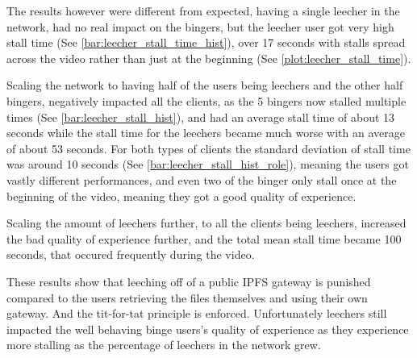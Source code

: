 The results however were different from expected, having a single leecher in the network, had no real impact on the bingers, but the leecher user got very high stall time (See \autoref{bar:leecher_stall_time_hist}), over 17 seconds with stalls spread across the video rather than just at the beginning (See \autoref{plot:leecher_stall_time}). 






Scaling the network to having half of the users being leechers and the other half bingers, negatively impacted all the clients, as the 5 bingers now stalled multiple times (See \autoref{bar:leecher_stall_hist}), and had an average stall time of about 13 seconds while the stall time for the leechers became much worse with an average of about 53 seconds. For both types of clients the standard deviation of stall time was around 10 seconds (See \autoref{bar:leecher_stall_hist_role}), meaning the users got vastly different performances, and even two of the binger only stall once at the beginning of the video, meaning they got a good quality of experience.






%

Scaling the amount of leechers further, to all the clients being leechers, increased the bad quality of experience further, and the total mean stall time became 100 seconds, that occured frequently during the video.

These results show that leeching off of a public \ac{IPFS} gateway is punished compared to the users retrieving the files themselves and using their own gateway. And the tit-for-tat principle is enforced. Unfortunately leechers still impacted the well behaving binge users's quality of experience as they experience more stalling as the percentage of leechers in the network grew.

